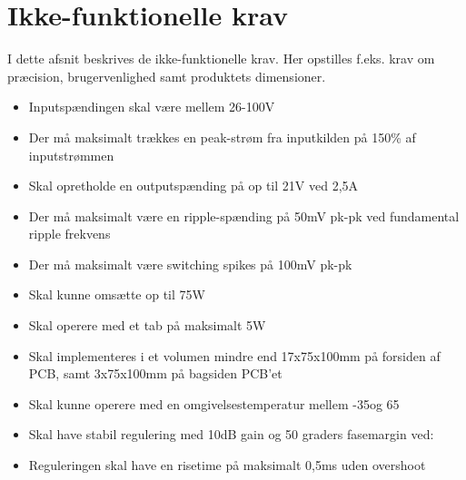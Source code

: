 \clearpage

\section{Ikke-funktionelle krav}
I dette afsnit beskrives de ikke-funktionelle krav. Her opstilles f.eks. krav om præcision, brugervenlighed samt produktets dimensioner.
\begin{itemize}
			\item Inputspændingen skal være mellem 26-100V
			\item Der må maksimalt trækkes en peak-strøm fra inputkilden på 150\% af inputstrømmen
			\item Skal opretholde en outputspænding på op til 21V ved 2,5A
			\item Der må maksimalt være en ripple-spænding på 50mV pk-pk ved fundamental ripple frekvens
			\item Der må maksimalt være switching spikes på 100mV pk-pk
			\item Skal kunne omsætte op til 75W
			\item Skal operere med et tab på maksimalt 5W %
			\item Skal implementeres i et volumen mindre end 17x75x100mm på forsiden af PCB, samt 3x75x100mm på bagsiden PCB'et
			\item Skal kunne operere med en omgivelsestemperatur mellem -35\degreeCelsius  og 65\degreeCelsius
			\item Skal have stabil regulering med 10dB gain og 50 graders fasemargin ved:
			\item Reguleringen skal have en risetime på maksimalt 0,5ms uden overshoot
					
\end{itemize}
